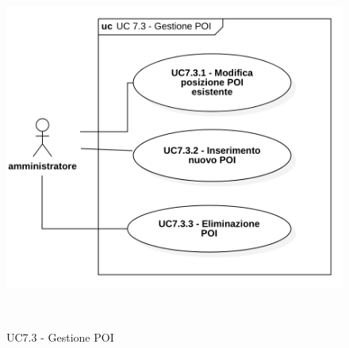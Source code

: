 \begin{figure}[H]

​    \centering

​    \includegraphics[scale=0.52]{res/images/uc7-3.png}

​    \caption{UC7.3 - Gestione POI}

\end{figure}



